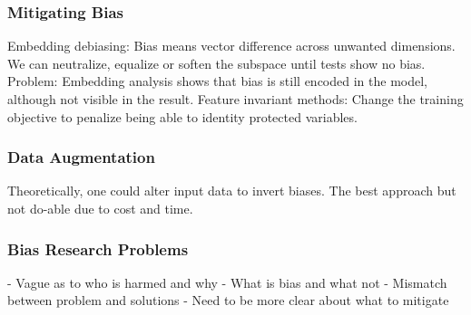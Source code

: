 \documentclass{scrartcl}
\begin{document}
\subsubsection*{Mitigating Bias}
Embedding debiasing: Bias means vector difference across unwanted dimensions. We can neutralize, equalize or soften the subspace until tests show no bias. Problem: Embedding analysis shows that bias is still encoded in the model, although not visible in the result.
Feature invariant methods: Change the training objective to penalize being able to identity protected variables.
\subsubsection*{Data Augmentation}
Theoretically, one could alter input data to invert biases. The best approach but not do-able due to cost and time.
\subsubsection*{Bias Research Problems}
- Vague as to who is harmed and why
- What is bias and what not
- Mismatch between problem and solutions
- Need to be more clear about what to mitigate
\end{document}
